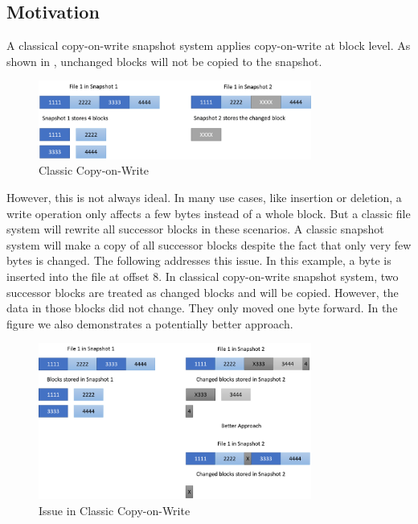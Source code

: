 \subsection{Motivation}

    A classical copy-on-write snapshot system applies copy-on-write at block level. As shown in , unchanged blocks will not be copied to the snapshot.

\begin{figure}[t]
\centering
\includegraphics[width=0.8\textwidth]{Chapter-4/figs/fig4.png}
\caption{Classic Copy-on-Write}
\label{fig:classic_cow}
\end{figure}

    However, this is not always ideal. In many use cases, like insertion or deletion, a write operation only affects a few bytes instead of a whole block. But a classic file system will rewrite all successor blocks in these scenarios. A classic snapshot system will make a copy of all successor blocks despite the fact that only very few bytes is changed. The following  addresses this issue. In this example, a byte is inserted into the file at offset 8. In classical copy-on-write snapshot system, two successor blocks are treated as changed blocks and will be copied. However, the data in those blocks did not change. They only moved one byte forward. In the figure we also demonstrates a potentially better approach.

\begin{figure}[t]
\centering
\includegraphics[width=0.8\textwidth]{Chapter-4/figs/fig5.png}
\caption{Issue in Classic Copy-on-Write}
\label{fig:issue_classic_cow}
\end{figure}
 
